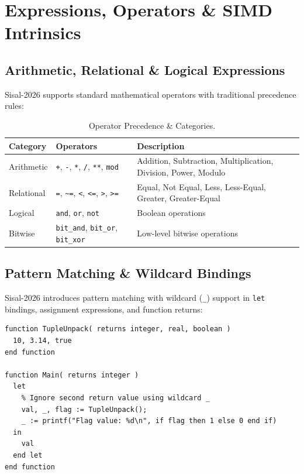 \chapter{Expressions, Operators \& SIMD Intrinsics}
\label{chap:expressions_operators}

\section{Arithmetic, Relational \& Logical Expressions}
Sisal-2026 supports standard mathematical operators with traditional precedence rules:

\begin{table}[h!]
\centering
\begin{tabularx}{\textwidth}{llX}
\toprule
\textbf{Category} & \textbf{Operators} & \textbf{Description} \\
\midrule
Arithmetic & \texttt{+}, \texttt{-}, \texttt{*}, \texttt{/}, \texttt{**}, \texttt{mod} & Addition, Subtraction, Multiplication, Division, Power, Modulo \\
Relational & \texttt{=}, \texttt{\textasciitilde=}, \texttt{<}, \texttt{<=}, \texttt{>}, \texttt{>=} & Equal, Not Equal, Less, Less-Equal, Greater, Greater-Equal \\
Logical & \texttt{and}, \texttt{or}, \texttt{not} & Boolean operations \\
Bitwise & \texttt{bit\_and}, \texttt{bit\_or}, \texttt{bit\_xor} & Low-level bitwise operations \\
\bottomrule
\end{tabularx}
\caption{Operator Precedence \& Categories.}
\label{tab:operators}
\end{table}

\section{Pattern Matching \& Wildcard Bindings}
\label{sec:wildcard}
Sisal-2026 introduces pattern matching with wildcard (\texttt{\_}) support in \texttt{let} bindings, assignment expressions, and function returns:

\begin{lstlisting}[caption={Wildcard Pattern Matching Examples}]
function TupleUnpack( returns integer, real, boolean )
  10, 3.14, true
end function

function Main( returns integer )
  let
    % Ignore second return value using wildcard _
    val, _, flag := TupleUnpack();
    _ := printf("Flag value: %d\n", if flag then 1 else 0 end if)
  in
    val
  end let
end function
\end{lstlisting}

